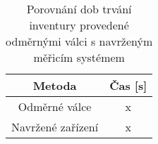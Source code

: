 


\begin{table}[H]
    \centering
    \begin{tabular}{|c|c|}
    \hline
        Metoda & Čas [s]\\ \hline \hline
        Odměrné válce & x\\ \hline
        Navržené zařízení & x\\ \hline
    \end{tabular}
    \caption{Porovnání dob trvání inventury provedené odměrnými válci s navrženým měřicím systémem}
    \label{tab:delka_inventury}
\end{table}








